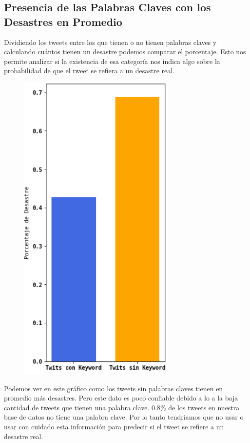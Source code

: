 \documentclass[titlepage,a4paper]{article}
\begin{document}
\subsection{\Large Presencia de las Palabras Claves con los Desastres en Promedio }
{\Large
{
Dividiendo los tweets entre los que tienen o no tienen palabras claves y calculando cuántos tienen un desastre podemos comparar el porcentaje. Esto nos permite analizar si la existencia de esa categoría nos indica algo sobre la probabilidad de que el tweet se refiera a un desastre real.
\par}
\begin{figure}[H]
 \centering
 \includegraphics[width=0.7\textwidth, height=0.4\textheight, keepaspectratio]{graficos/barras_palabras_claves_desastre.png}
\end{figure}
{
Podemos ver en este gráfico como los tweets sin palabras claves tienen en promedio más desastres. Pero este dato es poco confiable debido a lo a la baja cantidad de tweets que tienen una palabra clave. 0.8\% de los tweets en nuestra base de datos no tiene una palabra clave. Por lo tanto tendríamos que no usar o usar con cuidado esta información para predecir si el tweet se refiere a un desastre real.
}}
\end{document}
